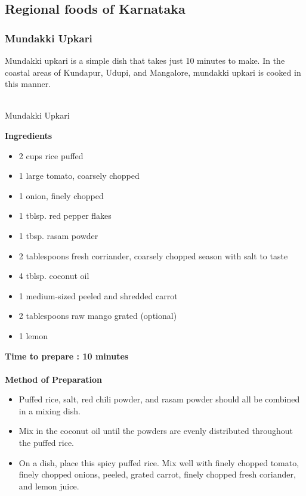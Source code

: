 \documentclass[12pt]{article}
\newcommand{\img}[2]{\scalebox{#1}{\texttt{[image: \#2]}}}
\begin{document}
	\subsection{Regional foods of Karnataka}
	\subsubsection{Mundakki Upkari}
	\par Mundakki upkari is a simple dish that takes just 10 minutes to make. In the coastal areas of Kundapur, Udupi, and Mangalore, mundakki upkari is cooked in this manner.

	\begin{center}
		\img{.5}{Food/mundakki_upkari.jpg} \\ Mundakki Upkari
	\end{center}

	\noindent \textbf{Ingredients}
	\begin{itemize}
		\item 2 cups rice puffed
		\item 1 large tomato, coarsely chopped
		\item 1 onion, finely chopped
		\item 1 tblsp. red pepper flakes
		\item 1 tbsp. rasam powder
		\item 2 tablespoons fresh corriander, coarsely chopped season with salt to taste
		 \newpage
		\item 4 tblsp. coconut oil
		\item 1 medium-sized peeled and shredded carrot
		\item 2 tablespoons raw mango grated (optional)
		\item 1 lemon
	\end{itemize}

	\noindent \vspace{1em} \textbf{Time to prepare : 10 minutes} \\ ~ \\
	\textbf{Method of Preparation}
	\begin{itemize}
		\item Puffed rice, salt, red chili powder, and rasam powder should all be combined in a mixing dish.
		\item Mix in the coconut oil until the powders are evenly distributed throughout the puffed rice.
		\item On a dish, place this spicy puffed rice. Mix well with finely chopped tomato, finely chopped onions, peeled, grated carrot, finely chopped fresh coriander, and lemon juice.
	\end{itemize}  \newpage
\end{document}

